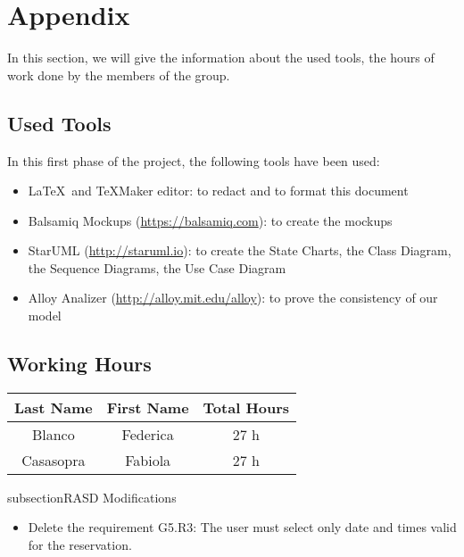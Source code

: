 \section{Appendix} \label{sec:appendix}

In this section, we will give the information about the used tools, the hours of work done by the members of the group.

\subsection{Used Tools} \label{tools}

In this first phase of the project, the following tools have been used:

\begin{itemize}
	\item \LaTeX\ and TeXMaker editor: to redact and to format this document
	\item Balsamiq Mockups (\url{https://balsamiq.com}): to create the mockups
	\item StarUML (\url{http://staruml.io}): to create the State Charts, the Class Diagram, the Sequence Diagrams, the Use Case Diagram 
	\item Alloy Analizer (\url{http://alloy.mit.edu/alloy}): to prove the consistency of our model
\end{itemize}

\subsection{Working Hours} \label{worked}

\begin{table}[htbp]
\begin{center}
\begin{tabular}[t]{ccc}

\hline
\textbf{Last Name} & \textbf{First Name} & \textbf{Total Hours} \\
\hline
Blanco & Federica &  27 h\\
\hline
Casasopra & Fabiola &  27 h\\
\hline

\end{tabular}
\end{center}
\end{table}

subsection{RASD Modifications} \label{modify}
\begin{itemize}
\item Delete the requirement G5.R3: The user must select only date and times valid for the reservation.
\end{itemize}